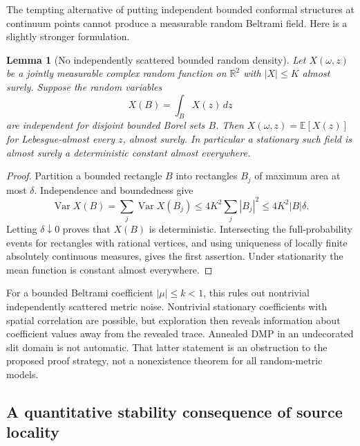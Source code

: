 \documentclass[11pt]{article}
\newtheorem{lemma}[theorem]{Lemma}
\theoremstyle{definition}\newtheorem{definition}[theorem]{Definition}
\theoremstyle{remark}\newtheorem{remark}[theorem]{Remark}
\begin{document}
The tempting alternative of putting independent bounded conformal structures
at continuum points cannot produce a measurable random Beltrami field.
Here is a slightly stronger formulation.

\begin{lemma}[No independently scattered bounded random density]
Let $X(\omega,z)$ be a jointly measurable complex random function on
$\mathbb R^2$ with $|X|\leq K$ almost surely.  Suppose the random variables
\[
 X(B)=\int_B X(z)\,dz
\]
are independent for disjoint bounded Borel sets $B$.  Then
$X(\omega,z)=\mathbb E[X(z)]$ for Lebesgue-almost every $z$, almost surely.
In particular a stationary such field is almost surely a deterministic
constant almost everywhere.
\end{lemma}

\begin{proof}
Partition a bounded rectangle $B$ into rectangles $B_j$ of maximum area
at most $\delta$.  Independence and boundedness give
\[
 \operatorname{Var}X(B)=\sum_j\operatorname{Var}X(B_j)
       \leq4K^2\sum_j|B_j|^2
       \leq4K^2|B|\delta.
\]
Letting $\delta\downarrow0$ proves that $X(B)$ is deterministic.
Intersecting the full-probability events for rectangles with rational
vertices, and using uniqueness of locally finite absolutely continuous
measures, gives the first assertion.  Under stationarity the mean function
is constant almost everywhere.
\end{proof}

For a bounded Beltrami coefficient $|\mu|\leq k<1$, this rules out nontrivial
independently scattered metric noise.  Nontrivial stationary coefficients
with spatial correlation are possible, but exploration then reveals
information about coefficient values away from the revealed trace.  Annealed
DMP in an undecorated slit domain is not automatic.  That latter statement
is an obstruction to the proposed proof strategy, not a nonexistence theorem
for all random-metric models.

\subsection{A quantitative stability consequence of source locality}
\end{document}
